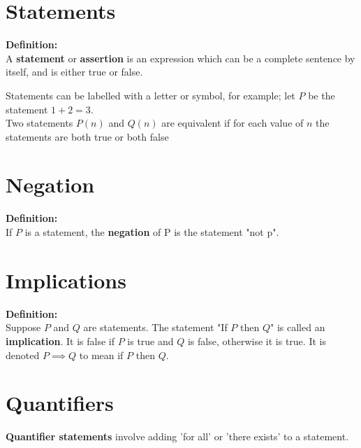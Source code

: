 \documentclass{report}
\newenvironment{frameblue}[1][BlueViolet]
  {\begin{tcolorbox}[colframe=#1,colback=white]}
  {\end{tcolorbox}}
\begin{document}
\section{Statements}

\begin{frameblue}
    \textbf{Definition:}\\
    A \textbf{statement} or \textbf{assertion} is an expression which can be a complete sentence by itself, and is either true or false.
\end{frameblue}

Statements can be labelled with a letter or symbol, for example; let $P$ be the statement $1 + 2 =3$.\\
Two statements $P(n)$ and $Q(n)$ are equivalent if for each value of $n$ the statements are both true or both false

\section{Negation}

\begin{frameblue}
    \textbf{Definition:}\\
    If $P$ is a statement, the \textbf{negation} of P is the statement "not p".
\end{frameblue}

\section{Implications}

\begin{frameblue}
    \textbf{Definition:}\\
    Suppose $P$ and $Q$ are statements. The statement "If $P$ then $Q$" is called an \textbf{implication}. It is false if $P$ is true and $Q$ is false, otherwise it is true. It is denoted $P \implies Q$ to mean if $P$ then $Q$.
\end{frameblue}

\section{Quantifiers}

\textbf{Quantifier statements} involve adding 'for all' or 'there exists' to a statement.
\end{document}

